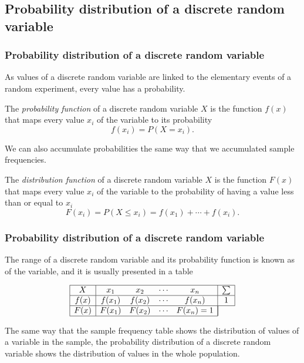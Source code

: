 \subsection{Probability distribution of a discrete random variable}

\begin{frame}
\frametitle{Probability distribution of a discrete random variable}
As values of a discrete random variable are linked to the elementary events of a random experiment, every value has a probability. 
\begin{definition}
The \emph{probability function} of a discrete random variable $X$ is the function $f(x)$ that maps every value $x_i$ of
the variable to its probability
\[
f(x_i) = P(X=x_i).
\]
\end{definition}

We can also accumulate probabilities the same way that we accumulated sample frequencies. 

\begin{definition}
The \emph{distribution function} of a discrete random variable $X$ is the function $F(x)$ that maps every value $x_i$ of
the variable to the probability of having a value less than or equal to $x_i$ 
\[
F(x_i) = P(X\leq x_i) = f(x_1)+\cdots +f(x_i).
\]
\end{definition}
\end{frame}


\begin{frame}
\frametitle{Probability distribution of a discrete random variable}
The range of a discrete random variable and its probability function is known as  of the variable, and it is usually presented in a table 

\[
\begin{array}{|c|cccc|c|}
\hline
X & x_1 & x_2 & \cdots & x_n & \sum\\ \hline
f(x) & f(x_1) & f(x_2) & \cdots & f(x_n) & 1\\
\hline
F(x) & F(x_1) & F(x_2) & \cdots & F(x_n) =1 &\multicolumn{1}{|c}{} \\
\cline{1-5}
\end{array}
\]

The same way that the sample frequency table shows the distribution of values of a variable in the sample, the
probability distribution of a discrete random variable shows the distribution of values in the whole population. 
\end{frame}


